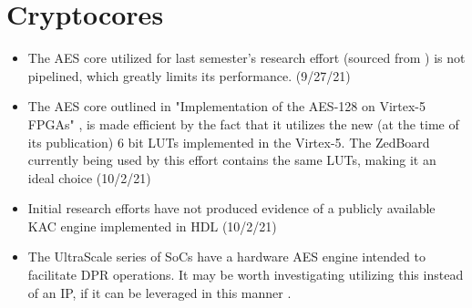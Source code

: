 \section{Cryptocores}\label{sec:Cryptocores}
\begin{itemize}
    \item The AES core utilized for last semester's research effort (sourced from \cite{tsang_aes_2018}) is not pipelined, which greatly limits its performance. (9/27/21)
    \item The AES core outlined in "Implementation of the AES-128 on Virtex-5 FPGAs" \cite{bulens_implementation_2008}, is made efficient by the fact that it utilizes the new (at the time of its publication) 6 bit LUTs implemented in the Virtex-5. The ZedBoard currently being used by this effort contains the same LUTs, making it an ideal choice (10/2/21)
    \item Initial research efforts have not produced evidence of a publicly available KAC engine implemented in HDL (10/2/21)
    \item The UltraScale series of SoCs have a hardware AES engine intended to facilitate DPR operations. It may be worth investigating utilizing this instead of an IP, if it can be leveraged in this manner \cite{noauthor_using_2021}.
\end{itemize}